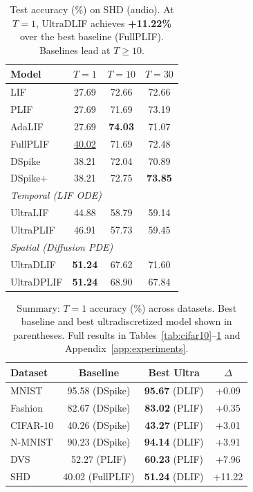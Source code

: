\documentclass{article}
\theoremstyle{plain}
\theoremstyle{definition}
\theoremstyle{remark}
\begin{document}
\begin{table}[t]
\caption{Test accuracy (\%) on SHD (audio). At $T{=}1$, UltraDLIF achieves \textbf{+11.22\%} over the best baseline (FullPLIF). Baselines lead at $T{\geq}10$.}
\label{tab:shd}
\vskip 0.1in
\begin{center}
\begin{small}
\begin{tabular}{lccc}
\toprule
Model & $T{=}1$ & $T{=}10$ & $T{=}30$ \\
\midrule
LIF        & 27.69 & 72.66 & 72.66 \\
PLIF       & 27.69 & 71.69 & 73.19 \\
AdaLIF     & 27.69 & \textbf{74.03} & 71.07 \\
FullPLIF   & \underline{40.02} & 71.69 & 72.48 \\
DSpike     & 38.21 & 72.04 & 70.89 \\
DSpike+    & 38.21 & 72.75 & \textbf{73.85} \\
\midrule
\multicolumn{4}{l}{\textit{Temporal (LIF ODE)}} \\
UltraLIF   & 44.88 & 58.79 & 59.14 \\
UltraPLIF  & 46.91 & 57.73 & 59.45 \\
\midrule
\multicolumn{4}{l}{\textit{Spatial (Diffusion PDE)}} \\
UltraDLIF  & \textbf{51.24} & 67.62 & 71.60 \\
UltraDPLIF & \textbf{51.24} & 68.90 & 67.84 \\
\bottomrule
\end{tabular}
\end{small}
\end{center}
\vskip -0.1in
\end{table}

\begin{table}[t]
\caption{Summary: $T{=}1$ accuracy (\%) across datasets. Best baseline and best ultradiscretized model shown in parentheses. Full results in Tables~\ref{tab:cifar10}--\ref{tab:shd} and Appendix~\ref{app:experiments}.}
\label{tab:t1_all}
\vskip 0.1in
\begin{center}
\begin{small}
\begin{tabular}{lccc}
\toprule
Dataset & Baseline & Best Ultra & $\Delta$ \\
\midrule
MNIST & 95.58 (DSpike) & \textbf{95.67} (DLIF) & +0.09 \\
Fashion & 82.67 (DSpike) & \textbf{83.02} (PLIF) & +0.35 \\
CIFAR-10 & 40.26 (DSpike) & \textbf{43.27} (PLIF) & +3.01 \\
N-MNIST & 90.23 (DSpike) & \textbf{94.14} (DLIF) & +3.91 \\
DVS & 52.27 (PLIF) & \textbf{60.23} (PLIF) & +7.96 \\
SHD & 40.02 (FullPLIF) & \textbf{51.24} (DLIF) & +11.22 \\
\bottomrule
\end{tabular}
\end{small}
\end{center}
\vskip -0.1in
\end{table}
\end{document}
